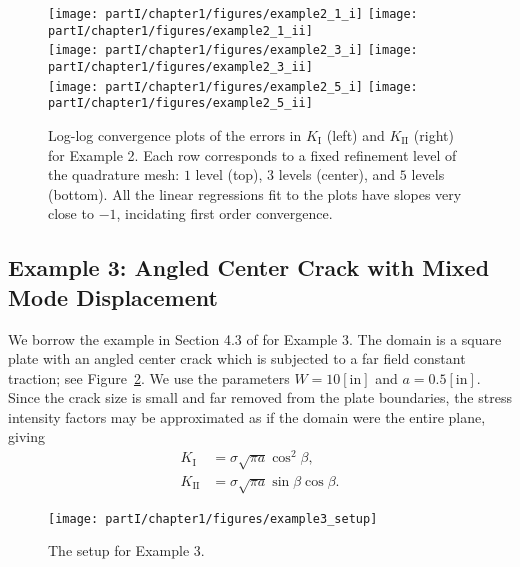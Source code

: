 \setlength{\figurewidth}{0.49\textwidth}
\begin{figure}[htbp]
\centering
\texttt{[image: partI/chapter1/figures/example2\_1\_i]}
\texttt{[image: partI/chapter1/figures/example2\_1\_ii]} \\
\texttt{[image: partI/chapter1/figures/example2\_3\_i]}
\texttt{[image: partI/chapter1/figures/example2\_3\_ii]} \\
\texttt{[image: partI/chapter1/figures/example2\_5\_i]}
\texttt{[image: partI/chapter1/figures/example2\_5\_ii]}
\caption{Log-log convergence plots of the errors in $K_{\text{I}}$ (left) and $K_{\text{II}}$ (right) for Example 2. Each row corresponds to a fixed refinement level of the quadrature mesh: $1$ level (top), $3$ levels (center), and $5$ levels (bottom). All the linear regressions fit to the plots have slopes very close to $-1$, incidating first order convergence.}
\label{fig:chap1.example2.convergence}
\end{figure}

\subsection{Example 3: Angled Center Crack with Mixed Mode Displacement}

We borrow the example in Section 4.3 of \cite{Moes99} for Example 3. The domain is a square plate with an angled center crack which is subjected to a far field constant traction; see Figure~\ref{fig:chap1.example3.setup}. We use the parameters $W = 10 [\text{in}]$ and $a = 0.5 [\text{in}]$. Since the crack size is small and far removed from the plate boundaries, the stress intensity factors may be approximated as if the domain were the entire plane, giving
\begin{subequations} \label{eq:chap1.example3.K}
\begin{align}
K_{\text{I}} & = \sigma  \sqrt{\pi a} \cos^2 \beta, \\
K_{\text{II}} & = \sigma \sqrt{\pi a} \sin \beta \cos \beta.
\end{align}
\end{subequations}

\setlength{\figurewidth}{0.25\textwidth}
\begin{figure}[htbp]
\centering
\texttt{[image: partI/chapter1/figures/example3\_setup]}
\caption{The setup for Example 3.}
\label{fig:chap1.example3.setup}
\end{figure}

